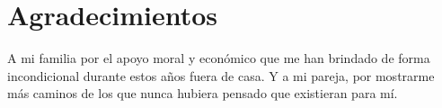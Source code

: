 \chapter*{Agradecimientos} \label{ch:agradecimientos}

A mi familia por el apoyo moral y económico que me han brindado de forma incondicional durante estos años fuera de casa. Y a mi pareja, por mostrarme más caminos de los que nunca hubiera pensado que existieran para mí.